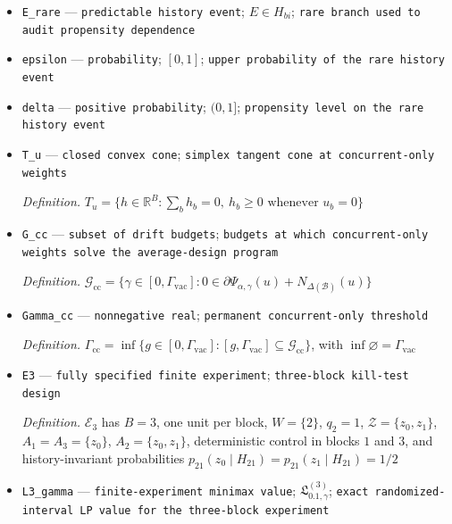 \documentclass{article}
\begin{document}
\begin{itemize}
  \par\smallskip\noindent\emph{Definition.} \(\Omega_{\mathcal D,\gamma}(\eta)=\sup\{\Delta:\Pi_0,\Pi_1\text{ are supported on }\mathcal Y_{M,\gamma},\ \sup_{Y\in\operatorname{supp}(\Pi_0)}\tau_W(Y)+\Delta\le\inf_{Y\in\operatorname{supp}(\Pi_1)}\tau_W(Y),\ \operatorname{TV}(\int P^O_{\mathcal D,Y}d\Pi_0,\int P^O_{\mathcal D,Y}d\Pi_1)\le\eta\}\)
  \item \texttt{E\_\allowbreak{}rare} --- \texttt{predictable history event}; \(E\in H_{bi}\); \texttt{rare branch used to audit propensity dependence}
  \item \texttt{epsilon} --- \texttt{probability}; \([0,1]\); \texttt{upper probability of the rare history event}
  \item \texttt{delta} --- \texttt{positive probability}; \((0,1]\); \texttt{propensity level on the rare history event}
  \item \texttt{T\_\allowbreak{}u} --- \texttt{closed convex cone}; \texttt{simplex tangent cone at concurrent-\allowbreak{}only weights}
  \par\smallskip\noindent\emph{Definition.} \(T_u=\{h\in\mathbb R^B:\sum_bh_b=0,\ h_b\ge0\text{ whenever }u_b=0\}\)
  \item \texttt{G\_\allowbreak{}cc} --- \texttt{subset of drift budgets}; \texttt{budgets at which concurrent-\allowbreak{}only weights solve the average-\allowbreak{}design program}
  \par\smallskip\noindent\emph{Definition.} \(\mathcal G_{\mathrm{cc}}=\{\gamma\in[0,\Gamma_{\mathrm{vac}}]:0\in\partial\Psi_{\alpha,\gamma}(u)+N_{\Delta(\mathcal B)}(u)\}\)
  \item \texttt{Gamma\_\allowbreak{}cc} --- \texttt{nonnegative real}; \texttt{permanent concurrent-\allowbreak{}only threshold}
  \par\smallskip\noindent\emph{Definition.} \(\Gamma_{\mathrm{cc}}=\inf\{g\in[0,\Gamma_{\mathrm{vac}}]:[g,\Gamma_{\mathrm{vac}}]\subseteq\mathcal G_{\mathrm{cc}}\}\), with \(\inf\varnothing=\Gamma_{\mathrm{vac}}\)
  \item \texttt{E3} --- \texttt{fully specified finite experiment}; \texttt{three-\allowbreak{}block kill-\allowbreak{}test design}
  \par\smallskip\noindent\emph{Definition.} \(\mathcal E_3\) has \(B=3\), one unit per block, \(W=\{2\}\), \(q_2=1\), \(\mathcal Z=\{z_0,z_1\}\), \(A_1=A_3=\{z_0\}\), \(A_2=\{z_0,z_1\}\), deterministic control in blocks \(1\) and \(3\), and history-invariant probabilities \(p_{21}(z_0\mid H_{21})=p_{21}(z_1\mid H_{21})=1/2\)
  \item \texttt{L3\_\allowbreak{}gamma} --- \texttt{finite-\allowbreak{}experiment minimax value}; \(\mathfrak L^{(3)}_{0.1,\gamma}\); \texttt{exact randomized-\allowbreak{}interval LP value for the three-\allowbreak{}block experiment}
\end{itemize}
\end{document}
